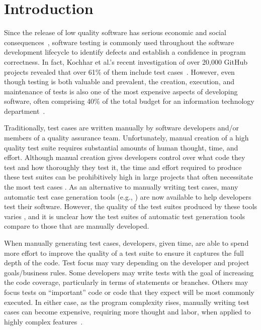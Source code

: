 
\section{Introduction}


Since the release of low quality software has serious economic and social consequences~\cite{tassey2002}, software testing is commonly used throughout the software development lifecycle to identify defects and establish a confidence in program correctness. In fact, Kochhar et al.'s recent investigation of over 20,000 GitHub projects revealed that over 61\% of them include test cases~\cite{kochhar2013}.  However, even though testing is both valuable and prevalent, the creation, execution, and maintenance of tests is also one of the most expensive aspects of developing software, often comprising 40\% of the total budget for an information technology department~\cite{vizard2013}.  

Traditionally, test cases are written manually by software developers and/or members of a quality assurance team.  Unfortunately, manual creation of a high quality test suite requires substantial amounts of human thought, time, and effort.  Although manual creation gives developers control over what code they test and how thoroughly they test it, the time and effort required to produce these test suites can be prohibitively high in large projects that often necessitate the most test cases \cite{kochhar2013}.  As an alternative to manually writing test cases, many automatic test case generation tools (e.g., \cite{fraser:2011:eat:2025113.2025179,pacheco2007feedback,csallner2004}) are now available to help developers test their software.  However, the quality of the test suites produced by these tools varies \cite{fraser2013c,fraser2013a}, and it is unclear how the test suites of automatic test generation tools compare to those that are manually developed.


When manually generating test cases, developers, given time, are able to spend more effort to improve the quality of a test suite to ensure it captures the full depth of the code.  Test focus may vary depending on the developer and project goals/business rules.  Some developers may write tests with the goal of increasing the code coverage, particularly in terms of statements or branches.  Others may focus tests on ``important'' code or code that they expect will be most commonly executed.   In either case, as the program complexity rises, manually writing test cases can become expensive, requiring more thought and labor, when applied to highly complex features~\cite{clarke1998automated}.

